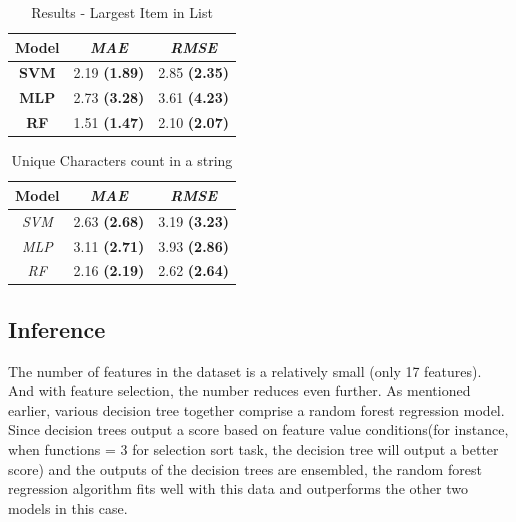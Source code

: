 \documentclass[conference]{IEEEtran}
\begin{document}
\begin{table}[h]
\centering
\begin{tabular}{|c|c|c|}
\hline
\textbf{Model} & \textit{\textbf{MAE}} & \textit{\textbf{RMSE}} \\ \hline
\textbf{SVM}   & 2.19 \textbf{(1.89)}           & 2.85 \textbf{(2.35)}            \\ \hline
\textbf{MLP}   & 2.73 \textbf{(3.28)}           & 3.61 \textbf{(4.23) }           \\ \hline
\textbf{RF}    & 1.51 \textbf{(1.47)}           & 2.10 \textbf{(2.07)}            \\ \hline
\end{tabular}
\caption{Results - Largest Item in List}
\label{tab:larg-list}
\end{table} 

\begin{table}[h]
\centering
\begin{tabular}{|c|c|c|}
\hline
\textbf{Model} & \textit{\textbf{MAE}} & \textit{\textbf{RMSE}} \\ \hline
\textit{SVM} & 2.63 \textbf{(2.68)} & 3.19 \textbf{(3.23)} \\ \hline
\textit{MLP} & 3.11 \textbf{(2.71)} & 3.93 \textbf{(2.86)} \\ \hline
\textit{RF} & 2.16 \textbf{(2.19)} & 2.62 \textbf{(2.64)} \\ \hline
\end{tabular}
\caption{Unique Characters count in a string}
\label{tab:my-table}
\end{table}

\subsection{Inference}

The number of features in the dataset is a relatively small (only 17
features). And with feature selection, the number reduces even
further.  As mentioned earlier, various decision tree together comprise a random forest regression model. Since decision trees output a score based on feature value conditions(for instance, when functions = 3 for selection sort task, the decision tree will output a better score) and the outputs of the decision trees are ensembled, the random forest regression algorithm fits well with this data and outperforms the other two models in this case.
\end{document}
